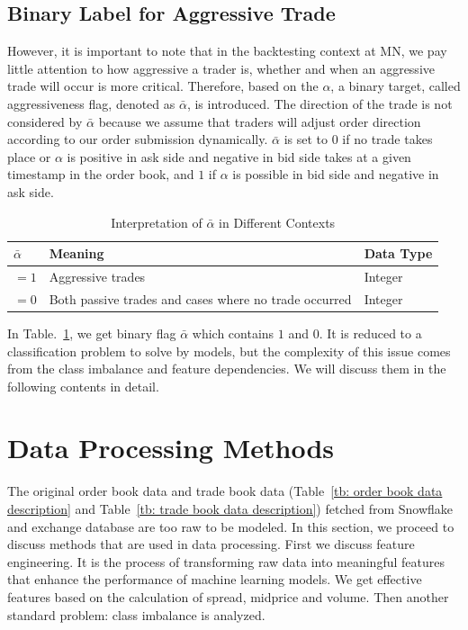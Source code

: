 \subsection{Binary Label for Aggressive Trade} \label{sec: aflag}
However, it is important to note that in the backtesting context at MN, we pay little attention to how aggressive a trader is, whether and when an aggressive trade will occur is more critical. Therefore, based on the $\alpha$, a binary target, called aggressiveness flag, denoted as $\bar{\alpha}$, is introduced. The direction of the trade is not considered by $\bar{\alpha}$ because we assume that traders will adjust order direction according to our order submission dynamically. $\bar{\alpha}$ is set to $0$ if no trade takes place or $\alpha$ is positive in ask side and negative in bid side takes at a given timestamp in the order book, and $1$ if $\alpha$ is possible in bid side and negative in ask side. 
\begin{table}[h] 
    \centering 
    \begin{tabular}{lll} 
        \toprule 
        \textbf{$\bar{\alpha}$} & \textbf{Meaning} & \textbf{Data Type} \\ 
        \midrule 
        $ = 1$ & Aggressive trades & Integer \\
        $ = 0$ & Both passive trades and cases where no trade occurred & Integer \\  
        \bottomrule 
    \end{tabular} 
    \caption{Interpretation of $\bar{\alpha}$ in Different Contexts}
    \label{tb: aflag_meaning}
\end{table}
In Table.~\ref{tb: aflag_meaning}, we get binary flag $\bar{\alpha}$ which contains $1$ and $0$. It is reduced to a classification problem to solve by models, but the complexity of this issue comes from the class imbalance and feature dependencies. We will discuss them in the following contents in detail.



\section{Data Processing Methods}
The original order book data and trade book data (Table~\ref{tb: order book data description} and Table~\ref{tb: trade book data description}) fetched from Snowflake and exchange database are too raw to be modeled. In this section, we proceed to discuss methods that are used in data processing. First we discuss feature engineering. It is the process of transforming raw data into meaningful features that enhance the performance of machine learning models. We get effective features based on the calculation of spread, midprice and volume. Then another standard problem: class imbalance is analyzed.

